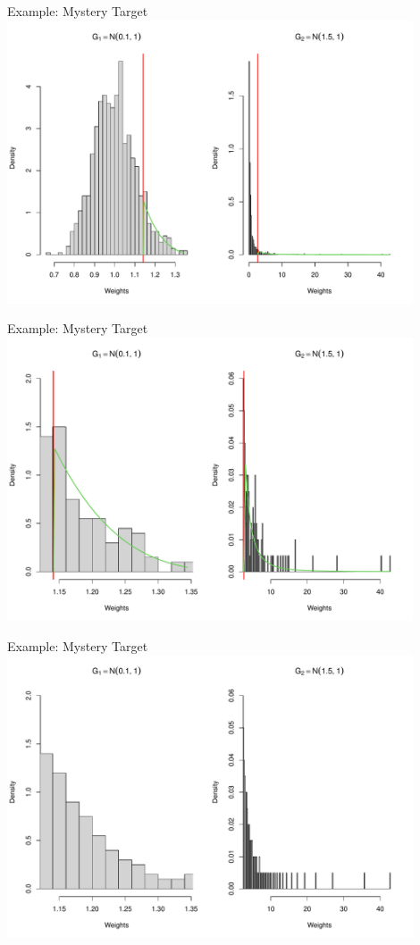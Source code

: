 \documentclass[14pt]{beamer}
\begin{document}
\begin{frame}{Example: Mystery Target}
    \centering
    \includegraphics[height=0.9\textheight, width=0.9\textwidth, keepaspectratio]{Figures/Wt Hist - Pareto Dens.pdf}
\end{frame}

\begin{frame}{Example: Mystery Target}
    \centering
    \includegraphics[height=0.9\textheight, width=0.9\textwidth, keepaspectratio]{Figures/Wt Hist - Pareto Dens Zoom.pdf}
\end{frame}

\begin{frame}{Example: Mystery Target}
    \centering
    \includegraphics[height=0.9\textheight, width=0.9\textwidth, keepaspectratio]{Figures/Wt Hist - Pareto Smooth Zoom.pdf}
\end{frame}
\end{document}
